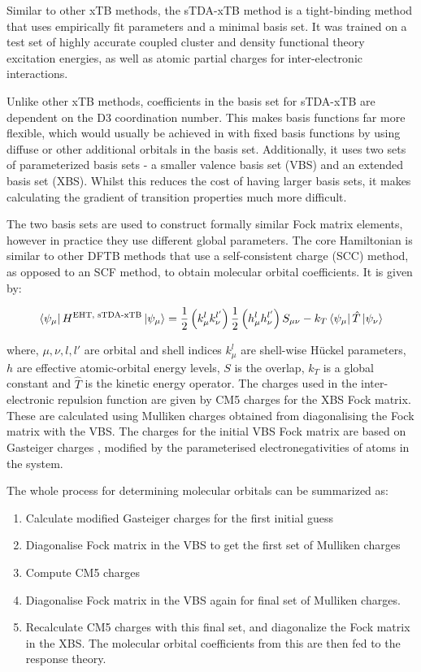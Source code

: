 Similar to other xTB methods, the sTDA-xTB method is a tight-binding method that
uses empirically fit parameters and a minimal basis set. It was trained on a
test set of highly accurate coupled cluster and density functional theory
excitation energies, as well as atomic partial charges for inter-electronic interactions.

Unlike other xTB methods, coefficients in the basis set for sTDA-xTB are dependent on the D3
coordination number. This makes basis functions far more flexible, which would usually
be achieved in with fixed basis functions by using diffuse or other additional orbitals in
the basis set. Additionally, it uses two sets of parameterized basis sets - a
smaller valence basis set (VBS) and an extended basis set (XBS). Whilst this reduces
the cost of having larger basis sets, it makes calculating the gradient of transition
properties much more difficult. 

The two basis sets are used to construct formally similar Fock matrix elements,
however in practice they use different global parameters. The core Hamiltonian
is similar to other DFTB methods that use a self-consistent charge (SCC) method, as
opposed to an SCF method, to obtain molecular orbital coefficients. It is given by:

\begin{equation}
\bra{\psi_\mu} H^{\text{EHT, sTDA-xTB}} \ket{\psi_\mu}= \frac{1}{2} \left(k^l_\mu k^{l'}_\nu\right) \frac{1}{2} \left(h^l_\mu h^{l'}_\nu\right) S_{\mu\nu} - k_T \bra{\psi_\mu}\hat{T}\ket{\psi_\nu}
\end{equation}

where, $\mu,\nu,l,l'$ are orbital and shell indices  $k^l_\mu$ are shell-wise 
H{\"u}ckel parameters, $h$ are effective atomic-orbital energy levels, $S$ is
the overlap, $k_T$ is a global constant and $\hat{T}$ is the kinetic energy 
operator. The charges used in the inter-electronic repulsion function are given 
by CM5 \cite{Marenich2012} charges for the XBS Fock matrix. These are calculated
using Mulliken charges obtained from diagonalising the Fock matrix with the VBS. 
The charges for the initial VBS Fock matrix are based on Gasteiger charges \cite{Gasteiger1978},
modified by the parameterised electronegativities of atoms in the system.

The whole process for determining molecular orbitals can be summarized as:
\begin{enumerate}
	\item Calculate modified Gasteiger charges for the first initial guess
	\item Diagonalise Fock matrix in the VBS to get the first set of Mulliken charges
	\item Compute CM5 charges
	\item Diagonalise Fock matrix in the VBS again for final set of Mulliken charges.
	\item Recalculate CM5 charges with this final set, and diagonalize the Fock matrix in the XBS. The molecular orbital coefficients from this are then fed to the response theory.
\end{enumerate}

